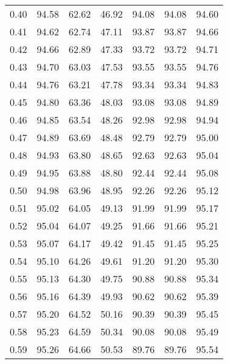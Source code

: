 \begin{tabular}{|c|c|c|c|c|c|c|}
      0.40 &     94.58 &     62.62 &      46.92 &   94.08 &      94.08 &         94.60 \\
      0.41 &     94.62 &     62.74 &      47.11 &   93.87 &      93.87 &         94.66 \\
      0.42 &     94.66 &     62.89 &      47.33 &   93.72 &      93.72 &         94.71 \\
      0.43 &     94.70 &     63.03 &      47.53 &   93.55 &      93.55 &         94.76 \\
      0.44 &     94.76 &     63.21 &      47.78 &   93.34 &      93.34 &         94.83 \\
      0.45 &     94.80 &     63.36 &      48.03 &   93.08 &      93.08 &         94.89 \\
      0.46 &     94.85 &     63.54 &      48.26 &   92.98 &      92.98 &         94.94 \\
      0.47 &     94.89 &     63.69 &      48.48 &   92.79 &      92.79 &         95.00 \\
      0.48 &     94.93 &     63.80 &      48.65 &   92.63 &      92.63 &         95.04 \\
      0.49 &     94.95 &     63.88 &      48.80 &   92.44 &      92.44 &         95.08 \\
      0.50 &     94.98 &     63.96 &      48.95 &   92.26 &      92.26 &         95.12 \\
      0.51 &     95.02 &     64.05 &      49.13 &   91.99 &      91.99 &         95.17 \\
      0.52 &     95.04 &     64.07 &      49.25 &   91.66 &      91.66 &         95.21 \\
      0.53 &     95.07 &     64.17 &      49.42 &   91.45 &      91.45 &         95.25 \\
      0.54 &     95.10 &     64.26 &      49.61 &   91.20 &      91.20 &         95.30 \\
      0.55 &     95.13 &     64.30 &      49.75 &   90.88 &      90.88 &         95.34 \\
      0.56 &     95.16 &     64.39 &      49.93 &   90.62 &      90.62 &         95.39 \\
      0.57 &     95.20 &     64.52 &      50.16 &   90.39 &      90.39 &         95.45 \\
      0.58 &     95.23 &     64.59 &      50.34 &   90.08 &      90.08 &         95.49 \\
      0.59 &     95.26 &     64.66 &      50.53 &   89.76 &      89.76 &         95.54 \\

\end{tabular}
